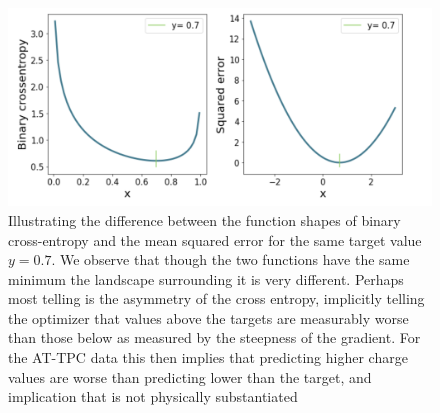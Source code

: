 \begin{figure}
\centering
\includegraphics[width=\textwidth]{plots/loss_func_shape.png}
\caption{Illustrating the difference between the function shapes of binary cross-entropy and the mean squared error for the same target value $y=0.7$. We observe that though the two functions have the same minimum the landscape surrounding it is very different. Perhaps most telling is the asymmetry of the cross entropy, implicitly telling the optimizer that values above the targets are measurably worse than those below as measured by the steepness of the gradient. For the AT-TPC data this then implies that predicting higher charge values are worse than predicting lower than the target, and implication that is not physically substantiated}\label{fig:loss_func_shape}
\end{figure}